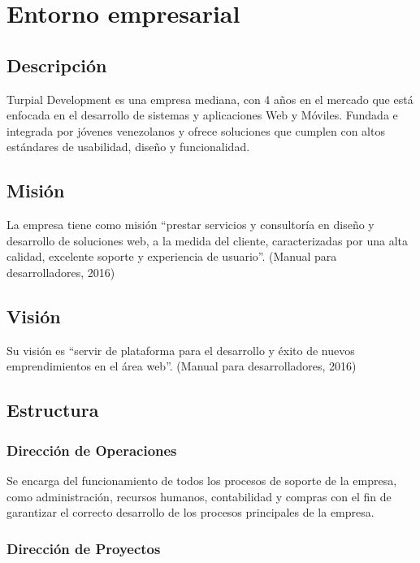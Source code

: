 \chapter{\textbf{Entorno empresarial}}

\thispagestyle{empty}

\section{Descripción}

Turpial Development es una empresa mediana, con 4 años en el mercado que está enfocada en el desarrollo de sistemas y aplicaciones Web y Móviles. Fundada e integrada por jóvenes venezolanos y ofrece soluciones que cumplen con altos estándares de usabilidad, diseño y funcionalidad.

\section{Misión}

La empresa tiene como misión “prestar servicios y consultoría en diseño y desarrollo de soluciones web, a la medida del cliente, caracterizadas por una alta calidad, excelente soporte y experiencia de usuario”. (Manual para desarrolladores, 2016)


\section{Visión}

Su visión es “servir de plataforma para el desarrollo y éxito de nuevos emprendimientos en el área web”. (Manual para desarrolladores, 2016)

\section{Estructura}

\subsection*{Dirección de Operaciones}

Se encarga del funcionamiento de todos los procesos de soporte de la empresa, como administración, recursos humanos, contabilidad y compras con el fin de garantizar el correcto desarrollo de los procesos principales de la empresa. 

\subsection*{Dirección de Proyectos} 

